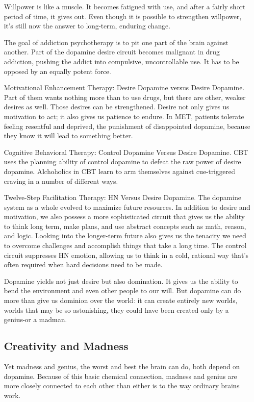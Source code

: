 \documentclass[ebook,12pt,oneside,openany]{memoir}
\begin{document}
Willpower is like a muscle. It becomes fatigued with use, and after a fairly short period of time, it gives out.
Even though it is possible to strengthen willpower, it's still now the answer to long-term, enduring change.

The goal of addiction psychotherapy is to pit one part of the brain against another.
Part of the dopamine desire circuit becomes malignant in drug addiction, pushing the addict
into compulsive, uncontrollable use. It has to be opposed by an equally potent force.

Motivational Enhancement Therapy: Desire Dopamine versus Desire Dopamine.
Part of them wants nothing more than to use drugs, but there are other, weaker desires as well.
Those desires can be strengthened. 
Desire not only gives us motivation to act; it also gives us patience to endure.
In MET, patients tolerate feeling resentful and deprived, the punishment of disappointed dopamine, 
because they know it will lead to something better.

Cognitive Behavioral Therapy: Control Dopamine Versus Desire Dopamine.
CBT uses the planning ability of control dopamine to defeat the raw power of desire dopamine.
Alchoholics in CBT learn to arm themselves against cue-triggered craving in a number of different ways.

Twelve-Step Facilitation Therapy: HN Versus Desire Dopamine.
The dopamine system as a whole evolved to maximize future resources. 
In addition to desire and motivation, we also possess a more sophisticated circuit that gives us the ability to 
think long term, make plans, and use abstract concepts such as math, reason, and logic.
Looking into the longer-term future also gives us the tenacity we need to overcome challenges and accomplish things that take a long time.
The control circuit suppresses HN emotion, allowing us to think in a cold, rational way that's often required
when hard decisions need to be made.

Dopamine yields not just desire but also domination. It gives us the ability to bend the environment and even other people 
to our will. But dopamine can do more than give us dominion over the world: it can create entirely new worlds, worlds that may be 
so astonishing, they could have been created only by a genius-or a madman. 

\subsection{Creativity and Madness}
Yet madness and genius, the worst and best the brain can do, both depend on dopamine.
Because of this basic chemical connection, madness and genius are more closely connected to each other 
than either is to the way ordinary brains work.
\end{document}
